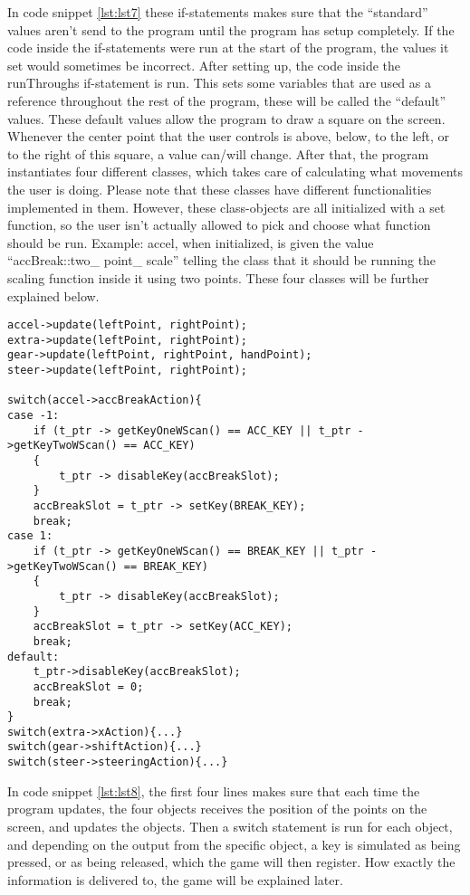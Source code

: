 In code snippet \ref{lst:lst7} these if-statements makes sure that the “standard” values aren’t send to the program until the program has setup completely. 
If the code inside the if-statements were run at the start of the program, the values it set would sometimes be incorrect. 
After setting up, the code inside the runThroughs if-statement is run. 
This sets some variables that are used as a reference throughout the rest of the program, these will be called the “default” values. 
These default values allow the program to draw a square on the screen. Whenever the center point that the user controls is above, below, to the left, or to the right of this square, a value can/will change. 
After that, the program instantiates four different classes, which takes care of calculating what movements the user is doing. 
Please note that these classes have different functionalities implemented in them. 
However, these class-objects are all initialized with a set function, so the user isn’t actually allowed to pick and choose what function should be run. 
Example: accel, when initialized, is given the value “accBreak::two\_ point\_ scale” telling the class that it should be running the scaling function inside it using two points.
These four classes will be further explained below.
\bigskip
\begin{lstlisting}[caption=Update, label=lst:lst8]
accel->update(leftPoint, rightPoint);
extra->update(leftPoint, rightPoint);
gear->update(leftPoint, rightPoint, handPoint);
steer->update(leftPoint, rightPoint);

switch(accel->accBreakAction){
case -1:
    if (t_ptr -> getKeyOneWScan() == ACC_KEY || t_ptr ->getKeyTwoWScan() == ACC_KEY)
    {
        t_ptr -> disableKey(accBreakSlot);
    }
    accBreakSlot = t_ptr -> setKey(BREAK_KEY);
    break;
case 1:
    if (t_ptr -> getKeyOneWScan() == BREAK_KEY || t_ptr ->getKeyTwoWScan() == BREAK_KEY)
    {
        t_ptr -> disableKey(accBreakSlot);
    }
    accBreakSlot = t_ptr -> setKey(ACC_KEY);
    break;
default:
    t_ptr->disableKey(accBreakSlot);
    accBreakSlot = 0;
    break;
}
switch(extra->xAction){...}
switch(gear->shiftAction){...}
switch(steer->steeringAction){...}
\end{lstlisting}

In code snippet \ref{lst:lst8}, the first four lines makes sure that each time the program updates, the four objects receives the position of the points on the screen, and updates the objects. 
Then a switch statement is run for each object, and depending on the output from the specific object, a key is simulated as being pressed, or as being released, which the game will then register. 
How exactly the information is delivered to, the game will be explained later.


